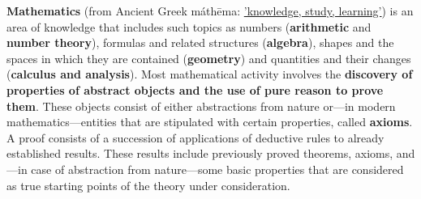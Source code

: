 \def\ind{\quad}
\textbf{Mathematics} (from Ancient Greek máthēma: \underline{'knowledge, study, learning'}) is an area of knowledge 
that includes such topics as numbers (\textbf{arithmetic} and \textbf{number theory}), formulas and related structures (\textbf{algebra}), shapes and the spaces in which they are contained (\textbf{geometry}) and quantities and their changes (\textbf{calculus and analysis}).
\endgraf
\def\ind{\quad}
Most mathematical activity involves the \textbf{discovery of properties of abstract objects and the use of pure reason to prove them}. These objects consist of either abstractions from nature or—in modern mathematics—entities that are stipulated with certain properties, called \textbf{axioms}. A proof consists of a succession of applications of deductive rules to already established results. These results include previously proved theorems, axioms, and—in case of abstraction from nature—some basic properties that are considered as true starting points of the theory under consideration.
